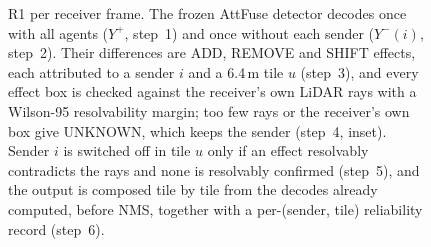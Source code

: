 \begin{figure}[t]
{}
\caption{R1 per receiver frame. The frozen AttFuse detector decodes once with all agents
($Y^{+}$, step~1) and once without each sender ($Y^{-}(i)$, step~2). Their differences are ADD, REMOVE and
SHIFT effects, each attributed to a sender $i$ and a 6.4\,m tile $u$ (step~3), and every effect box is checked
against the receiver's own LiDAR rays with a Wilson-95 resolvability margin; too few rays or the receiver's own
box give UNKNOWN, which keeps the sender (step~4, inset). Sender $i$ is switched off in tile $u$ only if an
effect resolvably contradicts the rays and none is resolvably confirmed (step~5), and the output is composed
tile by tile from the decodes already computed, before NMS, together with a per-(sender, tile) reliability
record (step~6).}
\label{fig:r1method}
\end{figure}
